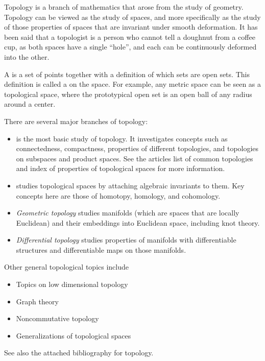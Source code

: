 \documentclass[12pt]{article}
\begin{document}
Topology is a branch of mathematics that arose from the study of geometry. Topology can be viewed as the study of spaces, and   more specifically as the study of those properties of spaces that are invariant under smooth deformation. It has been said that a topologist is a person who cannot tell a doughnut from a coffee cup, as both spaces have a single ``hole'', and each can be continuously deformed into the other.

A  is a set of points together with a definition of which sets are open sets. This definition is called a  on the space. For example, any metric space can be seen as a topological space, where the prototypical open set is an open ball of any radius around a center.

There are several major branches of topology:
\begin{itemize}
\item \emph{} is the most basic study of topology. It investigates concepts such as connectedness, compactness, properties of different topologies, and topologies on subspaces and product spaces. See the articles list of common topologies and index of properties of topological spaces for more information.

\item \emph{} studies topological spaces by attaching algebraic invariants to them. Key concepts here are those of homotopy, homology, and cohomology.

\item \emph{Geometric topology} studies manifolds (which are spaces that are locally Euclidean) and their embeddings into Euclidean space, including knot theory.

\item \emph{Differential topology} studies properties of manifolds with differentiable structures and differentiable maps on those manifolds.

\end{itemize}

Other general topological topics include
\begin{itemize}
\item Topics on low dimensional topology
\item Graph theory
\item Noncommutative topology
\item Generalizations of topological spaces
\end{itemize}

See also the attached bibliography for topology.
\end{document}
